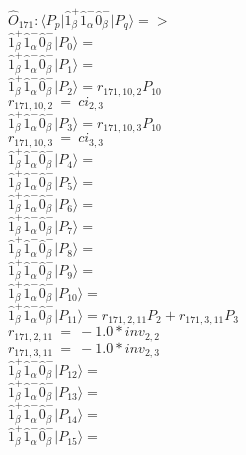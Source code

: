 \documentclass[14pt]{article}
\begin{document}
    $\hat{O}_{171}:  \langle{P_p}\vert \hat{1}_{\beta}^{+}\hat{1}_{\alpha}^{-}\hat{0}_{\beta}^{-} \vert{P_q}\rangle => $ \\ 
    $ \hat{1}_{\beta}^{+}\hat{1}_{\alpha}^{-}\hat{0}_{\beta}^{-} \vert{P_{0}}\rangle =  $ \\ 
    $ \hat{1}_{\beta}^{+}\hat{1}_{\alpha}^{-}\hat{0}_{\beta}^{-} \vert{P_{1}}\rangle =  $ \\ 
    $ \hat{1}_{\beta}^{+}\hat{1}_{\alpha}^{-}\hat{0}_{\beta}^{-} \vert{P_{2}}\rangle = {r}_{171,10,2}P_{10} $ \\ 
    ${r}_{171,10,2}\ =\ {ci}_{2,3} $ \\ 
    $ \hat{1}_{\beta}^{+}\hat{1}_{\alpha}^{-}\hat{0}_{\beta}^{-} \vert{P_{3}}\rangle = {r}_{171,10,3}P_{10} $ \\ 
    ${r}_{171,10,3}\ =\ {ci}_{3,3} $ \\ 
    $ \hat{1}_{\beta}^{+}\hat{1}_{\alpha}^{-}\hat{0}_{\beta}^{-} \vert{P_{4}}\rangle =  $ \\ 
    $ \hat{1}_{\beta}^{+}\hat{1}_{\alpha}^{-}\hat{0}_{\beta}^{-} \vert{P_{5}}\rangle =  $ \\ 
    $ \hat{1}_{\beta}^{+}\hat{1}_{\alpha}^{-}\hat{0}_{\beta}^{-} \vert{P_{6}}\rangle =  $ \\ 
    $ \hat{1}_{\beta}^{+}\hat{1}_{\alpha}^{-}\hat{0}_{\beta}^{-} \vert{P_{7}}\rangle =  $ \\ 
    $ \hat{1}_{\beta}^{+}\hat{1}_{\alpha}^{-}\hat{0}_{\beta}^{-} \vert{P_{8}}\rangle =  $ \\ 
    $ \hat{1}_{\beta}^{+}\hat{1}_{\alpha}^{-}\hat{0}_{\beta}^{-} \vert{P_{9}}\rangle =  $ \\ 
    $ \hat{1}_{\beta}^{+}\hat{1}_{\alpha}^{-}\hat{0}_{\beta}^{-} \vert{P_{10}}\rangle =  $ \\ 
    $ \hat{1}_{\beta}^{+}\hat{1}_{\alpha}^{-}\hat{0}_{\beta}^{-} \vert{P_{11}}\rangle = {r}_{171,2,11}P_{2}+{r}_{171,3,11}P_{3} $ \\ 
    ${r}_{171,2,11}\ =\ -1.0*{inv}_{2,2} $ \\ 
    ${r}_{171,3,11}\ =\ -1.0*{inv}_{2,3} $ \\ 
    $ \hat{1}_{\beta}^{+}\hat{1}_{\alpha}^{-}\hat{0}_{\beta}^{-} \vert{P_{12}}\rangle =  $ \\ 
    $ \hat{1}_{\beta}^{+}\hat{1}_{\alpha}^{-}\hat{0}_{\beta}^{-} \vert{P_{13}}\rangle =  $ \\ 
    $ \hat{1}_{\beta}^{+}\hat{1}_{\alpha}^{-}\hat{0}_{\beta}^{-} \vert{P_{14}}\rangle =  $ \\ 
    $ \hat{1}_{\beta}^{+}\hat{1}_{\alpha}^{-}\hat{0}_{\beta}^{-} \vert{P_{15}}\rangle =  $ \\ 
    
\end{document}
